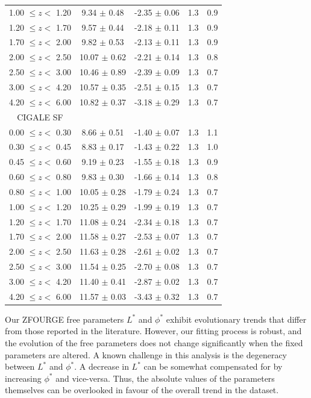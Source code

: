 \begin{table}[h]
\begin{center}
\begin{tabular}{ccccc}
        1.00 $\leq z <$ 1.20 &  9.34 $\pm$ 0.48 & -2.35 $\pm$ 0.06 & 1.3 & 0.9 \\
        1.20 $\leq z <$ 1.70 &  9.57 $\pm$ 0.44 & -2.18 $\pm$ 0.11 & 1.3 & 0.9 \\
        1.70 $\leq z <$ 2.00 &  9.82 $\pm$ 0.53 & -2.13 $\pm$ 0.11 & 1.3 & 0.9 \\
        2.00 $\leq z <$ 2.50 & 10.07 $\pm$ 0.62 & -2.21 $\pm$ 0.14 & 1.3 & 0.8 \\
        2.50 $\leq z <$ 3.00 & 10.46 $\pm$ 0.89 & -2.39 $\pm$ 0.09 & 1.3 & 0.7 \\
        3.00 $\leq z <$ 4.20 & 10.57 $\pm$ 0.35 & -2.51 $\pm$ 0.15 & 1.3 & 0.7 \\
        4.20 $\leq z <$ 6.00 & 10.82 $\pm$ 0.37 & -3.18 $\pm$ 0.29 & 1.3 & 0.7 \\
        \hline
        CIGALE SF \\
        \hline
        0.00 $\leq z <$ 0.30 &  8.66 $\pm$ 0.51 & -1.40 $\pm$ 0.07 & 1.3 & 1.1 \\
        0.30 $\leq z <$ 0.45 &  8.83 $\pm$ 0.17 & -1.43 $\pm$ 0.22 & 1.3 & 1.0 \\
        0.45 $\leq z <$ 0.60 &  9.19 $\pm$ 0.23 & -1.55 $\pm$ 0.18 & 1.3 & 0.9 \\
        0.60 $\leq z <$ 0.80 &  9.83 $\pm$ 0.30 & -1.66 $\pm$ 0.14 & 1.3 & 0.8 \\
        0.80 $\leq z <$ 1.00 & 10.05 $\pm$ 0.28 & -1.79 $\pm$ 0.24 & 1.3 & 0.7 \\
        1.00 $\leq z <$ 1.20 & 10.25 $\pm$ 0.29 & -1.99 $\pm$ 0.19 & 1.3 & 0.7 \\
        1.20 $\leq z <$ 1.70 & 11.08 $\pm$ 0.24 & -2.34 $\pm$ 0.18 & 1.3 & 0.7 \\
        1.70 $\leq z <$ 2.00 & 11.58 $\pm$ 0.27 & -2.53 $\pm$ 0.07 & 1.3 & 0.7 \\
        2.00 $\leq z <$ 2.50 & 11.63 $\pm$ 0.28 & -2.61 $\pm$ 0.02 & 1.3 & 0.7 \\
        2.50 $\leq z <$ 3.00 & 11.54 $\pm$ 0.25 & -2.70 $\pm$ 0.08 & 1.3 & 0.7 \\
        3.00 $\leq z <$ 4.20 & 11.40 $\pm$ 0.41 & -2.87 $\pm$ 0.02 & 1.3 & 0.7 \\
        4.20 $\leq z <$ 6.00 & 11.57 $\pm$ 0.03 & -3.43 $\pm$ 0.32 & 1.3 & 0.7      
        \botrule
    \end{tabular}
    \end{center}
\end{table}

Our ZFOURGE free parameters $L^{*}$ and $\phi^{*}$ exhibit evolutionary trends that differ from those reported in the literature. However, our fitting process is robust, and the evolution of the free parameters does not change significantly when the fixed parameters are altered. A known challenge in this analysis is the degeneracy between $L^{*}$ and $\phi^{*}$. A decrease in $L^{*}$ can be somewhat compensated for by increasing $\phi^{*}$ and vice-versa. Thus, the absolute values of the parameters themselves can be overlooked in favour of the overall trend in the dataset. 

